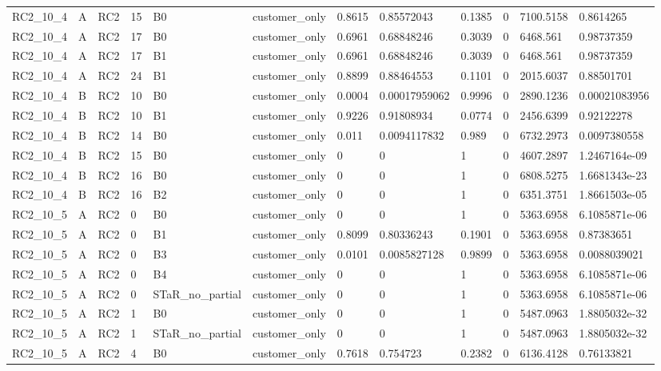 \begin{longtable}{llllllllllll}
RC2\_10\_4 & A & RC2 & 15 & B0 & customer\_only & 0.8615 & 0.85572043 & 0.1385 & 0 & 7100.5158 & 0.8614265 \\
RC2\_10\_4 & A & RC2 & 17 & B0 & customer\_only & 0.6961 & 0.68848246 & 0.3039 & 0 & 6468.561 & 0.98737359 \\
RC2\_10\_4 & A & RC2 & 17 & B1 & customer\_only & 0.6961 & 0.68848246 & 0.3039 & 0 & 6468.561 & 0.98737359 \\
RC2\_10\_4 & A & RC2 & 24 & B1 & customer\_only & 0.8899 & 0.88464553 & 0.1101 & 0 & 2015.6037 & 0.88501701 \\
RC2\_10\_4 & B & RC2 & 10 & B0 & customer\_only & 0.0004 & 0.00017959062 & 0.9996 & 0 & 2890.1236 & 0.00021083956 \\
RC2\_10\_4 & B & RC2 & 10 & B1 & customer\_only & 0.9226 & 0.91808934 & 0.0774 & 0 & 2456.6399 & 0.92122278 \\
RC2\_10\_4 & B & RC2 & 14 & B0 & customer\_only & 0.011 & 0.0094117832 & 0.989 & 0 & 6732.2973 & 0.0097380558 \\
RC2\_10\_4 & B & RC2 & 15 & B0 & customer\_only & 0 & 0 & 1 & 0 & 4607.2897 & 1.2467164e-09 \\
RC2\_10\_4 & B & RC2 & 16 & B0 & customer\_only & 0 & 0 & 1 & 0 & 6808.5275 & 1.6681343e-23 \\
RC2\_10\_4 & B & RC2 & 16 & B2 & customer\_only & 0 & 0 & 1 & 0 & 6351.3751 & 1.8661503e-05 \\
RC2\_10\_5 & A & RC2 & 0 & B0 & customer\_only & 0 & 0 & 1 & 0 & 5363.6958 & 6.1085871e-06 \\
RC2\_10\_5 & A & RC2 & 0 & B1 & customer\_only & 0.8099 & 0.80336243 & 0.1901 & 0 & 5363.6958 & 0.87383651 \\
RC2\_10\_5 & A & RC2 & 0 & B3 & customer\_only & 0.0101 & 0.0085827128 & 0.9899 & 0 & 5363.6958 & 0.0088039021 \\
RC2\_10\_5 & A & RC2 & 0 & B4 & customer\_only & 0 & 0 & 1 & 0 & 5363.6958 & 6.1085871e-06 \\
RC2\_10\_5 & A & RC2 & 0 & STaR\_no\_partial & customer\_only & 0 & 0 & 1 & 0 & 5363.6958 & 6.1085871e-06 \\
RC2\_10\_5 & A & RC2 & 1 & B0 & customer\_only & 0 & 0 & 1 & 0 & 5487.0963 & 1.8805032e-32 \\
RC2\_10\_5 & A & RC2 & 1 & STaR\_no\_partial & customer\_only & 0 & 0 & 1 & 0 & 5487.0963 & 1.8805032e-32 \\
RC2\_10\_5 & A & RC2 & 4 & B0 & customer\_only & 0.7618 & 0.754723 & 0.2382 & 0 & 6136.4128 & 0.76133821 \\

\end{longtable}
